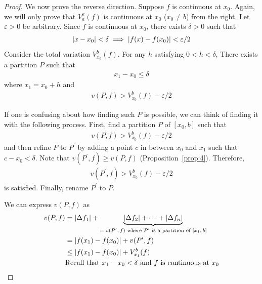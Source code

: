 \documentclass[thmcnt=section, color=blue, 12pt]{my-elegantbook}
\begin{document}
\begin{proof}
	We now prove the reverse direction.
	Suppose $f$ is continuous at $x_0$.
	Again, we will only prove that $V_a^x(f)$
	is continuous at $x_0$ ($x_0 \neq b$) from the right.
	Let $\varepsilon > 0$ be arbitrary.
	Since $f$ is continuous at $x_0$, there exists $\delta > 0$
	such that
	\begin{align*}
		\left\lvert x-x_0 \right\rvert < \delta \implies \left\lvert f(x) - f(x_0) \right\rvert < \varepsilon/2
	\end{align*}
	Consider the total variation $V_{x_0}^b(f)$.
	For any $h$ satisfying $0 < h < \delta$,
	There exists a partition $P$ such that
	\begin{align*}
		x_1 - x_0 \leq \delta
	\end{align*}
	where $x_1 = x_0 + h$
	and
	\begin{align}
		v(P, f) > V_{x_0}^b(f) - \varepsilon/2
		\label{eq:14}
	\end{align}
	\begin{note}
		If one is confusing about how finding such $P$ is possible,
		we can think of finding it with the following process.
		First, find a partition $P$ of $[x_0, b]$ such that
		\begin{align*}
			v(P, f) > V_{x_0}^b(f) - \varepsilon/2
		\end{align*}
		and then refine $P$ to $P^\prime$ by adding a point $c$ in between $x_0$ and $x_1$
		such that $c - x_0 < \delta$.
		Note that $v(P^\prime, f) \geq v(P, f)$ (Proposition~\ref{prop:4}).
		Therefore,
		\begin{align*}
			v(P^\prime, f) > V_{x_0}^b(f) - \varepsilon/2
		\end{align*}
		is satisfied.
		Finally, rename $P^\prime$ to $P$.
	\end{note}
	We can express $v(P, f)$ as
	\begin{align}
		v(P, f)
		 & = \abs{\Delta f_1} + \underbrace{ \abs{\Delta f_2} + \cdots + \abs{\Delta f_n} }_{ \text{$= v(P^\prime, f)$ where $P^\prime$ is a partition of $[x_1, b]$}} \nonumber \\
		 & = \abs{f(x_1) - f(x_0)} + v(P^\prime, f) \nonumber                                                                                                                    \\
		 & \leq \abs{f(x_1) - f(x_0)} + V_{x_1}^b(f) \nonumber                                                                                                                   \\
		 & \text{Recall that $x_1 - x_0 < \delta$ and $f$ is continuous at $x_0$} \nonumber                                                                                      \\

\end{align}
\end{proof}
\end{document}
